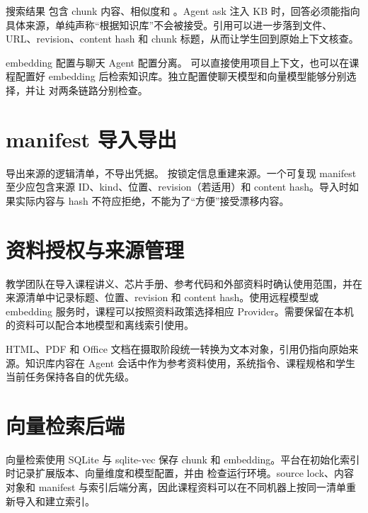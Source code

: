 搜索结果  包含 chunk 内容、相似度和 。Agent ask 注入 KB 时，回答必须能指向具体来源，单纯声称``根据知识库''不会被接受。引用可以进一步落到文件、URL、revision、content hash 和 chunk 标题，从而让学生回到原始上下文核查。

embedding 配置与聊天 Agent 配置分离。 可以直接使用项目上下文，也可以在课程配置好 embedding 后检索知识库。独立配置使聊天模型和向量模型能够分别选择，并让  对两条链路分别检查。

\section{manifest 导入导出}

 导出来源的逻辑清单，不导出凭据。 按锁定信息重建来源。一个可复现 manifest 至少应包含来源 ID、kind、位置、revision（若适用）和 content hash。导入时如果实际内容与 hash 不符应拒绝，不能为了``方便''接受漂移内容。

\section{资料授权与来源管理}

教学团队在导入课程讲义、芯片手册、参考代码和外部资料时确认使用范围，并在来源清单中记录标题、位置、revision 和 content hash。使用远程模型或 embedding 服务时，课程可以按照资料政策选择相应 Provider。需要保留在本机的资料可以配合本地模型和离线索引使用。

HTML、PDF 和 Office 文档在摄取阶段统一转换为文本对象，引用仍指向原始来源。知识库内容在 Agent 会话中作为参考资料使用，系统指令、课程规格和学生当前任务保持各自的优先级。

\section{向量检索后端}

向量检索使用 SQLite 与 sqlite-vec 保存 chunk 和 embedding。平台在初始化索引时记录扩展版本、向量维度和模型配置，并由  检查运行环境。source lock、内容对象和 manifest 与索引后端分离，因此课程资料可以在不同机器上按同一清单重新导入和建立索引。
